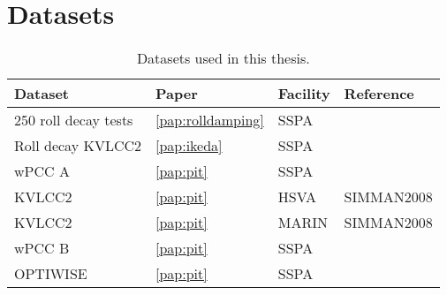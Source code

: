 \section{Datasets}\label{sec:datasets}
\begin{table}[h]
    \caption{Datasets used in this thesis.}
    \label{tab:datasets}
    \centering
    \begin{tabular}{p{3cm}p{0.5cm}p{1cm}p{6cm}}
         \hline
         Dataset & Paper & Facility & Reference \\
         \hline
         250 roll decay tests &  \ref{pap:rolldamping} & SSPA & ~\\
         Roll decay KVLCC2 & \ref{pap:ikeda} & SSPA & \textcite{alexanderssonKVLCC2RollDecay2021} \\ 
         wPCC A & \ref{pap:pit} & SSPA & \textcite{alexanderssonWPCCManoeuvringModel2022} \\
         KVLCC2 & \ref{pap:pit} & HSVA & SIMMAN2008 \cite{sternExperienceSIMMAN20082011} \\
         KVLCC2 & \ref{pap:pit} & MARIN & SIMMAN2008 \cite{sternExperienceSIMMAN20082011} \\
         wPCC B & \ref{pap:pit} & SSPA & \textcite{alexanderssonWPCCManoeuvringModel11062024} \\
         OPTIWISE & \ref{pap:pit} & SSPA & ~ \\
         \hline
    \end{tabular}
    
\end{table}